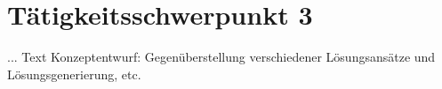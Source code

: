 \chapter{Tätigkeitsschwerpunkt 3}
\label{cha:Tätigkeitsschwerpunkt 3}

... Text Konzeptentwurf: Gegenüberstellung verschiedener Lösungsansätze und Lösungsgenerierung, etc.